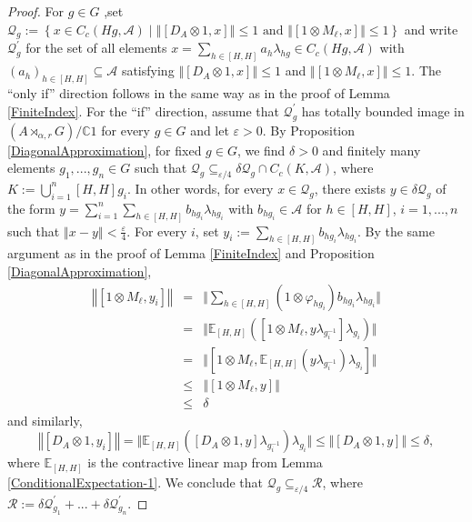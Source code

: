 \documentclass[a4paper,11pt,reqno]{amsart}
\numberwithin{equation}{section}
\numberwithin{equation}{section}
\theoremstyle{definition}
\theoremstyle{remark}
\theoremstyle{remark}
\begin{document}
\begin{proof} For $g\in G$ ,set $\mathcal{Q}_{g}:=\left\{ x\in C_{c}(Hg,\mathcal{A})\mid\left\Vert [D_{A}\otimes1,x]\right\Vert \leq1\text{ and }\left\Vert [1\otimes M_{\ell},x]\right\Vert \leq1\right\} $
and write $\mathcal{Q}_{g}^{\prime}$ for the set of all elements
$x=\sum_{h\in[H,H]}a_{h}\lambda_{hg}\in C_{c}(Hg,\mathcal{A})$ with
$(a_{h})_{h\in[H,H]}\subseteq\mathcal{A}$ satisfying $\left\Vert [D_{A}\otimes1,x]\right\Vert \leq1$
and $\left\Vert [1\otimes M_{\ell},x]\right\Vert \leq1$. The ``only
if'' direction follows in the same way as in the proof of Lemma \ref{FiniteIndex}.
For the ``if'' direction, assume that $\mathcal{Q}_{g}^{\prime}$
has totally bounded image in $(A\rtimes_{\alpha,r}G)/\mathbb{C}1$
for every $g\in G$ and let $\varepsilon>0$. By Proposition \ref{DiagonalApproximation},
for fixed $g\in G$, we find $\delta>0$ and finitely many elements
$g_{1},...,g_{n}\in G$ such that $\mathcal{Q}_{g}\subseteq_{\varepsilon/4}\delta\mathcal{Q}_{g}\cap C_{c}(K,\mathcal{A})$,
where $K:=\bigcup_{i=1}^{n}[H,H]g_{i}$. In other words, for every
$x\in\mathcal{Q}_{g}$, there exists $y\in\delta\mathcal{Q}_{g}$ of
the form $y=\sum_{i=1}^{n}\sum_{h\in[H,H]}b_{hg_{i}}\lambda_{hg_{i}}$
with $b_{hg_{i}}\in\mathcal{A}$ for $h\in[H,H]$, $i=1,...,n$ such
that $\left\Vert x-y\right\Vert <\frac{\varepsilon}{4}$. For every
$i$, set $y_{i}:=\sum_{h\in[H,H]}b_{hg_{i}}\lambda_{hg_{i}}$. By
the same argument as in the proof of Lemma \ref{FiniteIndex} and
Proposition \ref{DiagonalApproximation}, 
\begin{eqnarray*}
\left\Vert [1\otimes M_{\ell},y_{i}]\right\Vert  & = & \Vert\sum_{h\in[H,H]}(1\otimes\varphi_{hg_{i}})b_{hg_{i}}\lambda_{hg_{i}}\Vert\\
&=& \Vert\mathbb{E}_{[H,H]}([1\otimes M_{\ell},y\lambda_{g_{i}^{-1}}]\lambda_{g_{i}})\Vert \\
 & = & \Vert[1\otimes M_{\ell},\mathbb{E}_{[H,H]}(y\lambda_{g_{i}^{-1}})\lambda_{g_{i}}]\Vert \\
 & \leq & \left\Vert [1\otimes M_{\ell},y]\right\Vert \\
 & \leq & \delta
\end{eqnarray*}
and similarly,
\[
\left\Vert [D_{A}\otimes1,y_{i}]\right\Vert =\Vert\mathbb{E}_{[H,H]}([D_{A}\otimes1,y]\lambda_{g_{i}^{-1}})\lambda_{g_{i}}\Vert\leq\Vert[D_{A}\otimes1,y]\Vert\leq\delta,
\]
where $\mathbb{E}_{[H,H]}$ is the contractive linear map from Lemma
\ref{ConditionalExpectation-1}. We conclude that $\mathcal{Q}_{g}\subseteq_{\varepsilon/4}\mathcal{R}$,
where $\mathcal{R}:=\delta\mathcal{Q}_{g_{1}}^{\prime}+...+\delta\mathcal{Q}_{g_{n}}^{\prime}$.

\end{proof}
\end{document}

